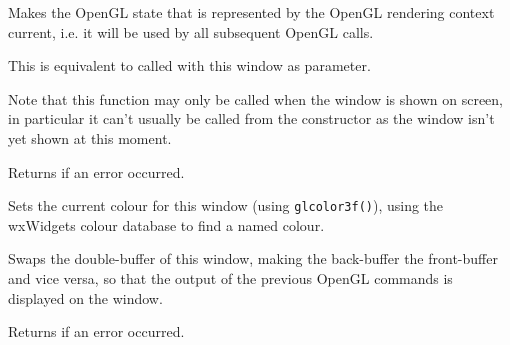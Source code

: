
Makes the OpenGL state that is represented by the OpenGL rendering context
 current, i.e. it will be used by all subsequent OpenGL calls.

This is equivalent to  
called with this window as parameter.

Note that this function may only be called when the window is shown on screen,
in particular it can't usually be called from the constructor as the window
isn't yet shown at this moment.

Returns \false if an error occurred.


\label{wxglcanvassetcolour}


Sets the current colour for this window (using \texttt{glcolor3f()}), using the
wxWidgets colour database to find a named colour.


\label{wxglcanvasswapbuffers}


Swaps the double-buffer of this window, making the back-buffer the front-buffer and vice versa,
so that the output of the previous OpenGL commands is displayed on the window.

Returns \false if an error occurred.

